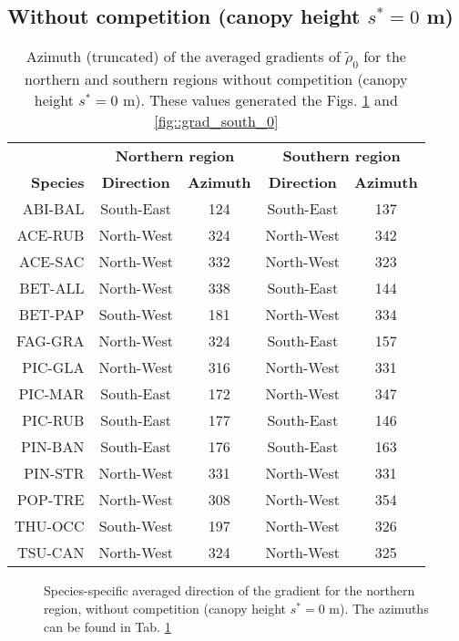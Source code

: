 \documentclass[letterpaper, 12pt]{article}
\newcommand {\s}{{s}^{*}}
\theoremstyle{theo}
\begin{document}
\begin{refsection}
\begin{onehalfspace}
	\subsection{Without competition (canopy height $ \s = 0 $ m)}
	\begin{table}[ht]
	\centering
	\caption[Azimuth without competition]{Azimuth (truncated) of the averaged gradients of $ \tilde \rho_0 $ for the northern and southern regions without competition (canopy height $ \s = 0 $ m). These values generated the Figs. \ref{fig::grad_north_0} and \ref{fig::grad_south_0} \label{tab::azimuth_0}}
	\begin{tabular}{rcccc}
		\toprule
		~ & \multicolumn{2}{c}{\textbf{Northern region}} & \multicolumn{2}{c}{\textbf{Southern region}} \\
		\cmidrule(lr){2-3} \cmidrule(lr){4-5}
		\textbf{Species} & \textbf{Direction} & \textbf{Azimuth} & \textbf{Direction} & \textbf{Azimuth} \\
		\midrule
			ABI-BAL & South-East & 124 & South-East & 137 \\
			ACE-RUB & North-West & 324 & North-West & 342 \\
			ACE-SAC & North-West & 332 & North-West & 323 \\
			BET-ALL & North-West & 338 & South-East & 144 \\
			BET-PAP & South-West & 181 & North-West & 334 \\
			FAG-GRA & North-West & 324 & South-East & 157 \\
			PIC-GLA & North-West & 316 & North-West & 331 \\
			PIC-MAR & South-East & 172 & North-West & 347 \\
			PIC-RUB & South-East & 177 & South-East & 146 \\
			PIN-BAN & South-East & 176 & South-East & 163 \\
			PIN-STR & North-West & 331 & North-West & 331 \\
			POP-TRE & North-West & 308 & North-West & 354 \\
			THU-OCC & South-West & 197 & North-West & 326 \\
			TSU-CAN & North-West & 324 & North-West & 325 \\
		\bottomrule
	\end{tabular}
	\end{table}
	
	\begin{figure}
		\centering
		
		\caption[Azimuth northern region without competition]{Species-specific averaged direction of the gradient for the northern region, without competition (canopy height $ \s = 0 $ m). The azimuths can be found in Tab. \ref{tab::azimuth_0} \label{fig::grad_north_0}}
	\end{figure}
	

\end{onehalfspace}
\end{refsection}
\end{document}
